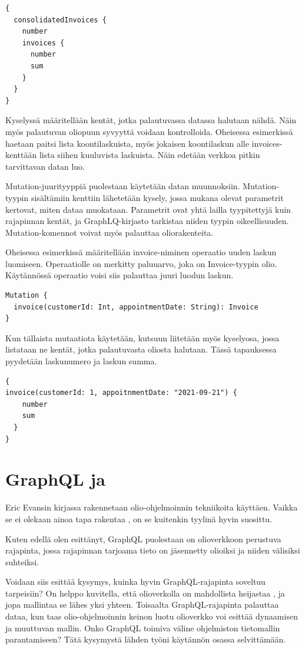 \begin{verbatim}
{
  consolidatedInvoices {
    number
    invoices {
      number
      sum
    }
  }
}
\end{verbatim}

Kyselyssä määritellään kentät, jotka palautuvassa datassa halutaan
nähdä. Näin myös palautuvan oliopuun syvyyttä voidaan kontrolloida.
Oheisessa esimerkissä haetaan paitsi lista koontilaskuista, myös
jokaisen koontilaskun alle invoices-kenttään lista siihen kuuluvista
laskuista. Näin edetään verkkoa pitkin tarvittavan datan luo.

Mutation-juurityyppiä puolestaan käytetään datan muunnoksiin.
Mutation-tyypin sisältämiin kenttiin lähetetään kysely, jossa mukana
olevat parametrit kertovat, miten dataa muokataan. Parametrit ovat yhtä
lailla tyypitettyjä kuin rajapinnan kentät, ja GraphLQ-kirjasto
tarkistaa niiden tyypin oikeellisuuden. Mutation-komennot voivat myös
palauttaa oliorakenteita.

Oheisessa esimerkissä määritellään invoice-niminen operaatio uuden
laskun luomiseen. Operaatiolle on merkitty paluuarvo, joka on
Invoice-tyypin olio. Käytännössä operaatio voisi siis palauttaa juuri
luodun laskun.

\begin{verbatim}
Mutation {
  invoice(customerId: Int, appointmentDate: String): Invoice
}
\end{verbatim}

Kun tällaista mutaatiota käytetään, kutsuun liitetään myös kyselyosa,
jossa listataan ne kentät, jotka palautuvasta oliosta halutaan. Tässä
tapauksessa pyydetään laskunumero ja laskun summa.

\begin{verbatim}
{
invoice(customerId: 1, appoitnmentDate: "2021-09-21") {
    number
    sum
  }
}
\end{verbatim}

\hypertarget{graphql-ja}{%
\section{\texorpdfstring{GraphQL ja
}{GraphQL ja }}\label{graphql-ja}}

Eric Evansin kirjassa  rakennetaan
olio-ohjelmoinnin tekniikoita käyttäen. Vaikka se ei olekaan ainoa tapa
rakentaa , on se kuitenkin tyylinä hyvin
suosittu.

Kuten edellä olen esittänyt, GraphQL puolestaan on olioverkkoon
perustuva rajapinta, jossa rajapinnan tarjoama tieto on jäsennetty
olioiksi ja niiden välisiksi suhteiksi.

Voidaan siis esittää kysymys, kuinka hyvin GraphQL-rajapinta soveltuu
 tarpeisiin? On helppo kuvitella, että olioverkolla on
mahdollista heijastaa , ja jopa mallintaa se
lähes yksi yhteen. Toisaalta GraphQL-rajapinta palauttaa dataa, kun taas
olio-ohjelmoinnin keinon luotu olioverkko voi esittää dynaamisen ja
muuttuvan mallin. Onko GraphQL toimiva väline ohjelmiston tietomallin
parantamiseen? Tätä kysymystä lähden työni käytännön osassa
selvittämään.
